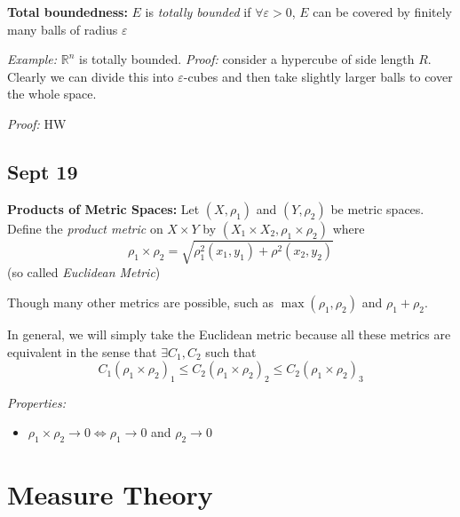 \documentclass[12pt]{report}
\newcommand{\R}{\mathbb{R}}
\newcommand{\ep}{\varepsilon}
\newcommand{\sub}{\subseteq}
\newenvironment*{tbox}[2][gray]{
    \begin{tcolorbox}[
        parbox=false,
        colback=#1!5!white,
        colframe=#1!75!black,
        breakable,
        title={#2}
    ]}
    {\end{tcolorbox}}
\begin{document}
    \textbf{Total boundedness:} $E$ is \emph{totally bounded} if $\forall \ep > 0$, $E$ can be covered by finitely many balls of radius $\ep$

    \emph{Example:} $\R^n$ is totally bounded. \emph{Proof:} consider a hypercube of side length $R$. Clearly we can divide this into $\ep$-cubes and then take slightly larger balls to cover the whole space.

    \begin{tbox}{\textbf{Theorem (Characterization of Compactness):} The following are equivalent: 
        \begin{enumerate}
            \item $E$ is complete and totally bounded
            \item Every sequence in $E$ has a convergent subsequence with its limit in $E$
            \item If $\{V_{\alpha}\}_{\alpha \in A}$ is an open cover of $E$, then there exists a finite set $F \sub A$ such that $\{U_{\alpha}\}_{\alpha \in F}$ covers $E$
        \end{enumerate}}
        \emph{Proof:} HW
    \end{tbox}

\section*{Sept 19}
    \textbf{Products of Metric Spaces:} Let $(X, \rho_1)$ and $(Y, \rho_2)$ be metric spaces. Define the \emph{product metric} on $X \times Y$ by $(X_1 \times X_2, \rho_1 \times \rho_2)$ where
    \[\rho_1 \times \rho_2 = \sqrt{\rho_1^2(x_1, y_1) + \rho^2(x_2, y_2)}\]
    (so called \emph{Euclidean Metric})

    Though many other metrics are possible, such as $\max(\rho_1, \rho_2)$ and $\rho_1 + \rho_2$. 

    In general, we will simply take the Euclidean metric because all these metrics are equivalent in the sense that $\exists C_1, C_2$ such that 
    \[C_1(\rho_1 \times \rho_2)_1 \leq C_2(\rho_1 \times \rho_2)_2 \leq C_2(\rho_1 \times \rho_2)_3\]

    \emph{Properties:}
    \begin{itemize}
        \item $\rho_1 \times \rho_2 \to 0 \iff \rho_1 \to 0$ and $\rho_2 \to 0$
    \end{itemize}

\chapter{Measure Theory}
\end{document}
